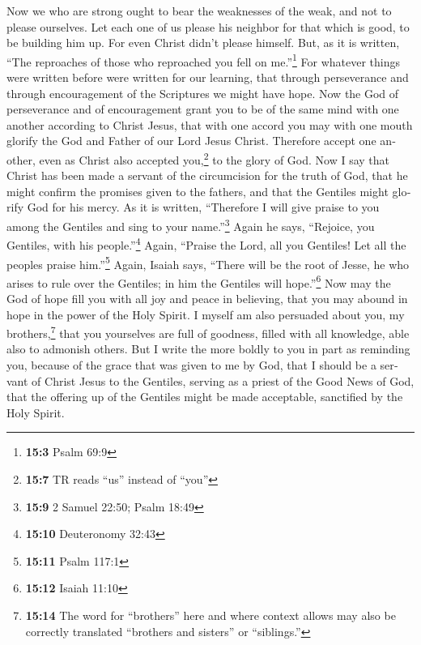 \begin{paracol}{2}
\begin{otherlanguage}{english}
 Now we who are strong ought to bear the weaknesses of the
weak, and not to please ourselves.  Let each one of us
please his neighbor for that which is good, to be building him up.
 For even Christ didn't please himself. But, as it is
written, ``The reproaches of those who reproached you fell on
me.''\footnote{\textbf{15:3} Psalm 69:9}  For whatever
things were written before were written for our learning, that through
perseverance and through encouragement of the Scriptures we might have
hope.  Now the God of perseverance and of encouragement
grant you to be of the same mind with one another according to Christ
Jesus,  that with one accord you may with one mouth
glorify the God and Father of our Lord Jesus Christ. 
Therefore accept one another, even as Christ also accepted
you,\footnote{\textbf{15:7} TR reads ``us'' instead of ``you''} to the
glory of God.  Now I say that Christ has been made a
servant of the circumcision for the truth of God, that he might confirm
the promises given to the fathers,  and that the Gentiles
might glorify God for his mercy. As it is written, ``Therefore I will
give praise to you among the Gentiles and sing to your
name.''\footnote{\textbf{15:9} 2 Samuel 22:50; Psalm 18:49}
 Again he says, ``Rejoice, you Gentiles, with his
people.''\footnote{\textbf{15:10} Deuteronomy 32:43} 
Again, ``Praise the Lord, all you Gentiles! Let all the peoples praise
him.''\footnote{\textbf{15:11} Psalm 117:1}  Again,
Isaiah says, ``There will be the root of Jesse, he who arises to rule
over the Gentiles; in him the Gentiles will hope.''\footnote{\textbf{15:12}
  Isaiah 11:10}  Now may the God of hope fill you with
all joy and peace in believing, that you may abound in hope in the power
of the Holy Spirit.  I myself am also persuaded about
you, my brothers,\footnote{\textbf{15:14} The word for ``brothers'' here
  and where context allows may also be correctly translated ``brothers
  and sisters'' or ``siblings.''} that you yourselves are full of
goodness, filled with all knowledge, able also to admonish others.
 But I write the more boldly to you in part as reminding
you, because of the grace that was given to me by God, 
that I should be a servant of Christ Jesus to the Gentiles, serving as a
priest of the Good News of God, that the offering up of the Gentiles
might be made acceptable, sanctified by the Holy Spirit. 

\end{otherlanguage}
\end{paracol}
